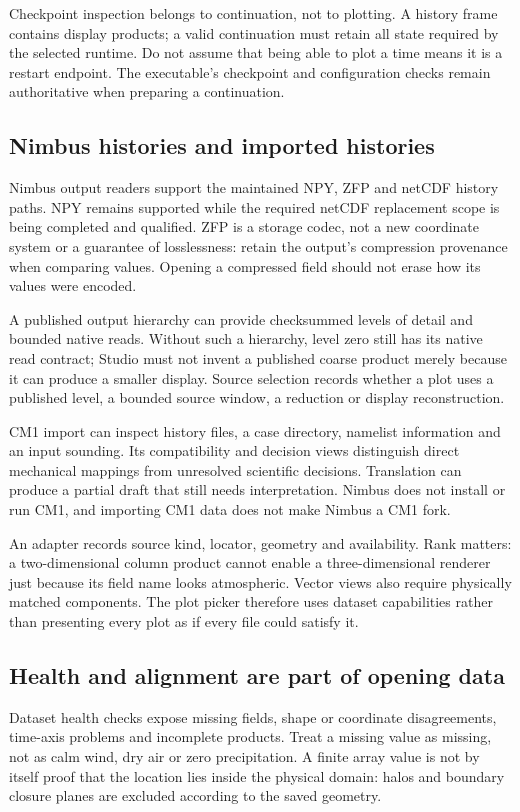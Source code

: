 Checkpoint inspection belongs to continuation, not to plotting. A history frame
contains display products; a valid continuation must retain all state required
by the selected runtime. Do not assume that being able to plot a time means it
is a restart endpoint. The executable's checkpoint and configuration checks
remain authoritative when preparing a continuation.

\subsection{Nimbus histories and imported histories}
Nimbus output readers support the maintained NPY, ZFP and netCDF history paths.
NPY remains supported while the required netCDF replacement scope is being
completed and qualified. ZFP is a storage codec, not a new coordinate system or
a guarantee of losslessness: retain the output's compression provenance when
comparing values. Opening a compressed field should not erase how its values
were encoded.

A published output hierarchy can provide checksummed levels of detail and
bounded native reads. Without such a hierarchy, level zero still has its native
read contract; Studio must not invent a published coarse product merely because
it can produce a smaller display. Source selection records whether a plot uses
a published level, a bounded source window, a reduction or display reconstruction.

CM1 import can inspect history files, a case directory, namelist information and
an input sounding. Its compatibility and decision views distinguish direct
mechanical mappings from unresolved scientific decisions. Translation can produce
a partial draft that still needs interpretation. Nimbus does not install or run
CM1, and importing CM1 data does not make Nimbus a CM1 fork.

An adapter records source kind, locator, geometry and availability. Rank matters:
a two-dimensional column product cannot enable a three-dimensional renderer just
because its field name looks atmospheric. Vector views also require physically
matched components. The plot picker therefore uses dataset capabilities rather
than presenting every plot as if every file could satisfy it.

\subsection{Health and alignment are part of opening data}
Dataset health checks expose missing fields, shape or coordinate disagreements,
time-axis problems and incomplete products. Treat a missing value as missing,
not as calm wind, dry air or zero precipitation. A finite array value is not by
itself proof that the location lies inside the physical domain: halos and boundary
closure planes are excluded according to the saved geometry.

